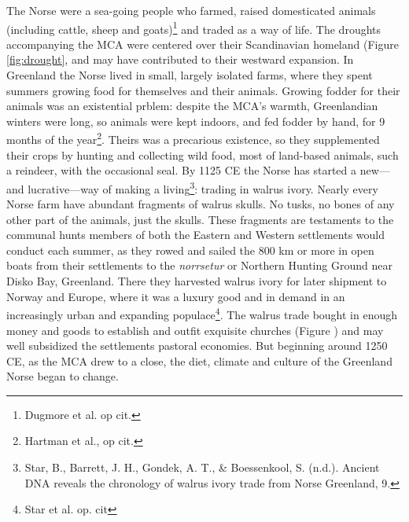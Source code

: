 \documentclass[amstex,12pt]{book}
\begin{document}
The Norse were a sea-going people who farmed, raised domesticated animals (including cattle, sheep and goats)\footnote{Dugmore et al. op cit.} and traded as a way of life. The droughts accompanying the MCA were centered over their Scandinavian homeland (Figure \ref{fig:drought}, and may have contributed to their westward expansion. In Greenland the Norse lived in small, largely isolated farms, where they spent summers growing food for themselves and their animals. Growing fodder for their animals was an existential prblem: despite the MCA's warmth, Greenlandian winters were long, so animals were kept indoors, and fed fodder by hand, for 9 months of the year\footnote{Hartman et al., op cit.}. Theirs was a precarious existence, so they supplemented their crops by hunting and collecting wild food, most of land-based animals, such a reindeer, with the occasional seal. By 1125 CE the Norse has started a new---and lucrative---way of making a living\footnote{Star, B., Barrett, J. H., Gondek, A. T., \& Boessenkool, S. (n.d.). Ancient DNA reveals the chronology of walrus ivory trade from Norse Greenland, 9.}: trading in walrus ivory. Nearly every Norse farm have abundant fragments of walrus skulls. No tusks, no bones of any other part of the animals, just the skulls. These fragments are testaments to the communal hunts members of both the Eastern and Western settlements would conduct each summer, as they rowed and sailed the 800 km or more in open boats from their settlements to the \textit{nor\dh rsetur} or Northern Hunting Ground near Disko Bay, Greenland. There they harvested walrus ivory for later shipment to Norway and Europe, where it was a luxury good and in demand in an increasingly urban and expanding populace\footnote{Star et al. op. cit}. The walrus trade bought in enough money and goods to establish and outfit exquisite churches (Figure ) and may well subsidized the settlements pastoral economies. But beginning around 1250 CE, as the MCA drew to a close, the diet, climate and culture of the Greenland Norse began to change. \\
\end{document}
